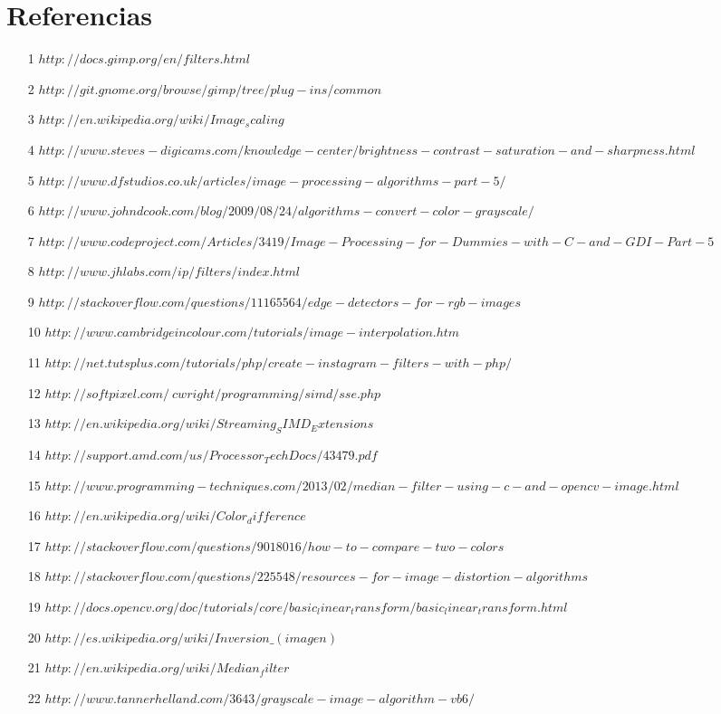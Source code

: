 \section{Referencias}

\begin{itemize}
\item[1] $http://docs.gimp.org/en/filters.html$
\item[2] $http://git.gnome.org/browse/gimp/tree/plug-ins/common$
\item[3] $http://en.wikipedia.org/wiki/Image_scaling$
\item[4] $http://www.steves-digicams.com/knowledge-center/brightness-contrast-saturation-and-sharpness.html$
\item[5] $http://www.dfstudios.co.uk/articles/image-processing-algorithms-part-5/$
\item[6] $http://www.johndcook.com/blog/2009/08/24/algorithms-convert-color-grayscale/$
\item[7] $http://www.codeproject.com/Articles/3419/Image-Processing-for-Dummies-with-C-and-GDI-Part-5$
\item[8] $http://www.jhlabs.com/ip/filters/index.html$
\item[9] $http://stackoverflow.com/questions/11165564/edge-detectors-for-rgb-images$
\item[10] $http://www.cambridgeincolour.com/tutorials/image-interpolation.htm$
\item[11] $http://net.tutsplus.com/tutorials/php/create-instagram-filters-with-php/$
\item[12] $http://softpixel.com/~cwright/programming/simd/sse.php$
\item[13] $http://en.wikipedia.org/wiki/Streaming_SIMD_Extensions$
\item[14] $http://support.amd.com/us/Processor_TechDocs/43479.pdf$
\item[15] $http://www.programming-techniques.com/2013/02/median-filter-using-c-and-opencv-image.html$
\item[16] $http://en.wikipedia.org/wiki/Color_difference$
\item[17] $http://stackoverflow.com/questions/9018016/how-to-compare-two-colors$
\item[18] $http://stackoverflow.com/questions/225548/resources-for-image-distortion-algorithms$
\item[19] $http://docs.opencv.org/doc/tutorials/core/basic_linear_transform/basic_linear_transform.html$
\item[20] $http://es.wikipedia.org/wiki/Inversion\_(imagen)$
\item[21] $http://en.wikipedia.org/wiki/Median_filter$
\item[22] $http://www.tannerhelland.com/3643/grayscale-image-algorithm-vb6/$

\end{itemize}